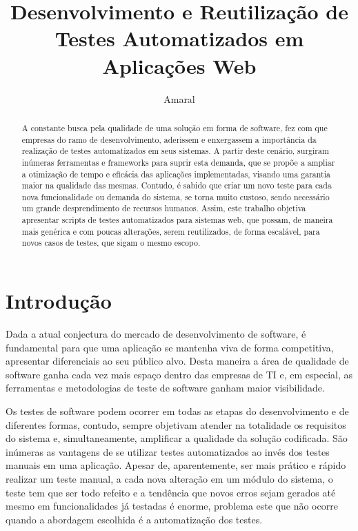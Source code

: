 \documentclass[tg]{mdtufsm}
\title{Desenvolvimento e Reutilização de Testes Automatizados em Aplicações Web}
\author{Amaral}{Lucas Antunes}
\institute{Centro de Tecnologia}
\date{}{Outubro}{2014}
\begin{document}
\maketitle
\makeapprove

\begin{abstract}
A constante busca pela qualidade de uma solução em forma de software, fez com que empresas do ramo de desenvolvimento,
aderissem e enxergassem a importância da realização de testes automatizados em seus sistemas. A partir deste cenário,
surgiram inúmeras ferramentas e frameworks para suprir esta demanda, que se propõe  a ampliar a otimização de tempo e
eficácia das aplicações implementadas, visando uma garantia maior na qualidade das mesmas. Contudo, é sabido que criar
um novo teste para cada nova funcionalidade ou demanda do sistema, se torna muito custoso, sendo necessário um grande
desprendimento de recursos humanos. Assim, este trabalho objetiva apresentar scripts de testes automatizados para
sistemas web, que possam, de maneira mais genérica e com poucas alterações, serem reutilizados, de forma escalável,
para novos casos de testes, que sigam o mesmo escopo.
\end{abstract}

\tableofcontents

\setlength{\baselineskip}{1.5\baselineskip}

\chapter{Introdução}

Dada a atual conjectura do mercado de desenvolvimento de software, é fundamental para
que uma aplicação se mantenha viva de forma competitiva, apresentar diferenciais ao seu público alvo. Desta
maneira a área de qualidade de software ganha cada vez mais espaço dentro das empresas de TI e, em especial, as ferramentas e
metodologias de teste de software ganham maior visibilidade.

Os testes de software podem ocorrer em todas as etapas do desenvolvimento e de diferentes formas, contudo,
sempre objetivam atender na totalidade os requisitos do sistema e, simultaneamente, amplificar a qualidade da solução
codificada. São inúmeras as vantagens de se utilizar testes automatizados ao invés dos testes manuais em uma aplicação.
Apesar de, aparentemente, ser mais prático e rápido realizar um teste manual, a cada nova alteração em um módulo do sistema,
o teste tem que ser todo refeito e a tendência que novos erros sejam gerados até mesmo em funcionalidades já testadas é enorme,
problema este que não ocorre quando a abordagem escolhida é a automatização dos testes.
\end{document}
